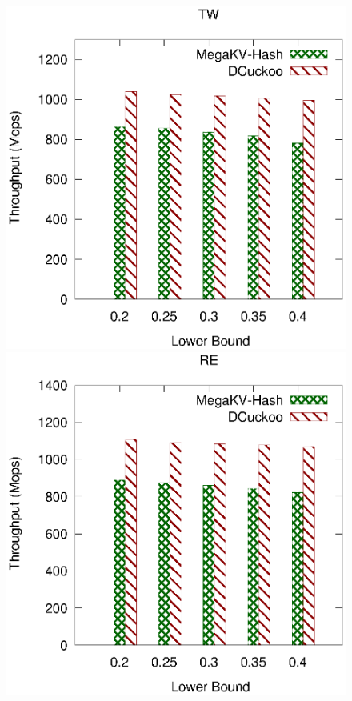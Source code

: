 

%





\begin{figure}[htp]
	\begin{minipage}{0.19\linewidth}\centering
		\includegraphics[width=\linewidth]{pic/dynamic/lower/dynamic_twitter.eps}
		\centerline{\dstwitter}
	\end{minipage}
	\begin{minipage}{0.19\linewidth}\centering
		\includegraphics[width=\linewidth]{pic/dynamic/lower/dynamic_reddit.eps}

\end{minipage}
\end{figure}
